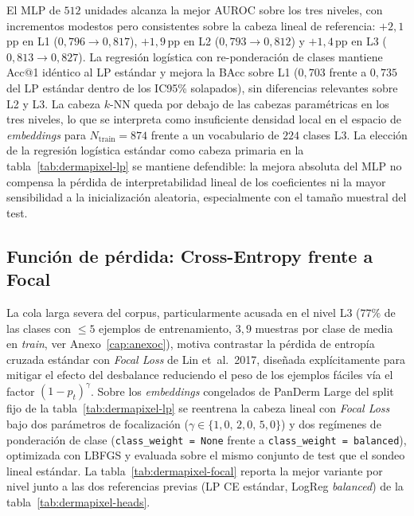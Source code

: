 El MLP de $512$ unidades alcanza la mejor AUROC sobre los tres
niveles, con incrementos modestos pero consistentes sobre la cabeza
lineal de referencia: $+2{,}1$\,pp en L1
($0{,}796 \to 0{,}817$), $+1{,}9$\,pp en L2
($0{,}793 \to 0{,}812$) y $+1{,}4$\,pp en L3
($0{,}813 \to 0{,}827$). La regresión logística con re-ponderación
de clases mantiene Acc@1 idéntico al LP estándar y mejora la BAcc
sobre L1 ($0{,}703$ frente a $0{,}735$ del LP estándar dentro de
los IC95\% solapados), sin diferencias relevantes sobre L2 y L3.
La cabeza $k$-NN queda por debajo de las cabezas paramétricas en
los tres niveles, lo que se interpreta como insuficiente densidad
local en el espacio de \emph{embeddings} para $N_{\mathrm{train}}
= 874$ frente a un vocabulario de $224$ clases L3. La elección de
la regresión logística estándar como cabeza primaria en la
tabla~\ref{tab:dermapixel-lp} se mantiene defendible: la mejora
absoluta del MLP no compensa la pérdida de interpretabilidad
lineal de los coeficientes ni la mayor sensibilidad a la
inicialización aleatoria, especialmente con el tamaño muestral del
test.

\subsection*{Función de pérdida: Cross-Entropy frente a Focal}
\label{sec:dermapixel-focal}

La cola larga severa del corpus, particularmente acusada en el
nivel L3 ($77\%$ de las clases con $\leq 5$ ejemplos de
entrenamiento, $3{,}9$ muestras por clase de media en
\emph{train}, ver Anexo~\ref{cap:anexoc}), motiva contrastar la
pérdida de entropía cruzada estándar con \emph{Focal Loss} de
Lin et~al.\ 2017, diseñada explícitamente para mitigar el efecto
del desbalance reduciendo el peso de los ejemplos fáciles vía el
factor $(1-p_t)^\gamma$. Sobre los \emph{embeddings} congelados de
PanDerm Large del split fijo de la tabla~\ref{tab:dermapixel-lp}
se reentrena la cabeza lineal con \emph{Focal Loss} bajo dos
parámetros de focalización ($\gamma \in \{1{,}0,\,2{,}0,\,5{,}0\}$)
y dos regímenes de ponderación de clase
(\texttt{class\_weight = None} frente a
\texttt{class\_weight = balanced}), optimizada con LBFGS y
evaluada sobre el mismo conjunto de test que el sondeo lineal
estándar. La tabla~\ref{tab:dermapixel-focal} reporta la mejor
variante por nivel junto a las dos referencias previas (LP CE
estándar, LogReg \emph{balanced}) de la
tabla~\ref{tab:dermapixel-heads}.

